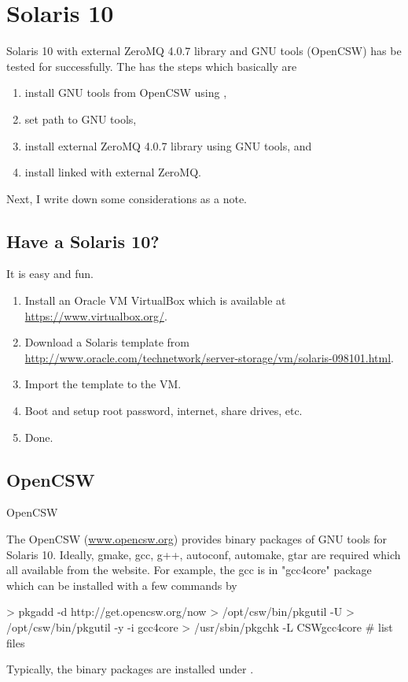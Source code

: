 \section[Solaris 10]{Solaris 10}
\label{sec:solaris_10}

Solaris 10 with external ZeroMQ 4.0.7 library and GNU tools (OpenCSW)
has be tested for  successfully. The 
has the steps which basically are
\begin{enumerate}
\item install GNU tools from OpenCSW using ,
\item set path to GNU tools,
\item install external ZeroMQ 4.0.7 library using GNU tools, and
\item install  linked with external ZeroMQ.
\end{enumerate}
Next, I write down some considerations as a note.


\subsection[Have a Solaris 10?]{Have a Solaris 10?}
\label{sec:have_solaris_10}
It is easy and fun.
\begin{enumerate}
\item
Install an Oracle VM VirtualBox which is available at
\url{https://www.virtualbox.org/}.
\item
Download a Solaris template from \\
\url{http://www.oracle.com/technetwork/server-storage/vm/solaris-098101.html}.
\item
Import the template to the VM.
\item
Boot and setup root password, internet, share drives, etc.
\item
Done.
\end{enumerate}


\subsection{OpenCSW}{OpenCSW}
\label{sec:opencsw}
The OpenCSW (\url{www.opencsw.org}) provides binary packages of GNU tools
for Solaris 10. Ideally, gmake, gcc, g++, autoconf, automake, gtar are
required which all available from the website. For example, the gcc is in
"gcc4core" package which can be installed with a few 
commands by
\begin{Code}
> pkgadd -d http://get.opencsw.org/now
> /opt/csw/bin/pkgutil -U
> /opt/csw/bin/pkgutil -y -i gcc4core 
> /usr/sbin/pkgchk -L CSWgcc4core # list files
\end{Code}
Typically, the binary packages are installed under
.

